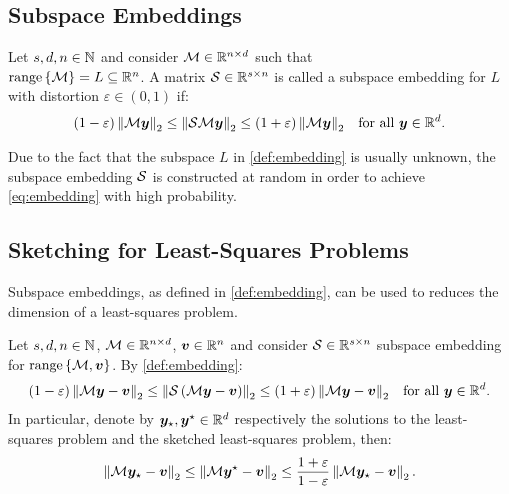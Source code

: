 \subsection{Subspace Embeddings}

\begin{definition} \label{def:embedding}
    Let $s, d, n \in \mathbb{N}$ and consider $\mathcal{M} \in \mathbb{R}^{n \times d}$ such that \\ $\operatorname*{range}\left\{\mathcal{M}\right\} = L \subseteq \mathbb{R}^{n}$. A matrix $\mathcal{S} \in \mathbb{R}^{s \times n}$ is called a subspace embedding for $L$ with distortion $\varepsilon \in \left(0, 1\right)$ if:
    \begin{align}
        \left( 1 - \varepsilon \right) \left\lVert \mathcal{M} \bm{y} \right\rVert_2 \leq \left\lVert \mathcal{S} \mathcal{M} \bm{y} \right\rVert_2 &\leq \left( 1 + \varepsilon \right) \left\lVert \mathcal{M} \bm{y} \right\rVert_2 &\text{for all } \bm{y} \in \mathbb{R}^{d}. \label{eq:embedding}
    \end{align}
\end{definition}

Due to the fact that the subspace $L$ in \cref{def:embedding} is usually unknown, the subspace embedding $\mathcal{S}$ is constructed at random in order to achieve \cref{eq:embedding} with high probability.

\subsection{Sketching for Least-Squares Problems}

Subspace embeddings, as defined in \cref{def:embedding}, can be used to reduces the dimension of a least-squares problem.

\begin{Fact} \label{fact:least_squares}
    Let $s, d, n \in \mathbb{N}$, $\mathcal{M} \in \mathbb{R}^{n \times d}$, $\bm{v} \in \mathbb{R}^{n}$ and consider $\mathcal{S} \in \mathbb{R}^{s \times n}$ subspace embedding for $\operatorname*{range}\left\{\mathcal{M}, \bm{v}\right\}$. By \cref{def:embedding}:
    \begin{align}
        \left( 1 - \varepsilon \right) \left\lVert \mathcal{M} \bm{y} - \bm{v} \right\rVert_2 \leq \left\lVert \mathcal{S} \left( \mathcal{M} \bm{y} - \bm{v} \right) \right\rVert_2 &\leq \left( 1 + \varepsilon \right) \left\lVert \mathcal{M} \bm{y} - \bm{v} \right\rVert_2 &\text{for all } \bm{y} \in \mathbb{R}^{d}. \label{eq:sketched_least_squares_1}
    \end{align}
    In particular, denote by $\bm{y}_{\star}, \bm{y}^{\star} \in \mathbb{R}^{d}$ respectively the solutions to the least-squares problem and the sketched least-squares problem, then:
    \begin{align}
        \left\lVert \mathcal{M} \bm{y}_{\star} - \bm{v} \right\rVert_2 \leq \left\lVert \mathcal{M} \bm{y}^{\star} - \bm{v} \right\rVert_2 \leq \frac{1 + \varepsilon}{1 - \varepsilon} \left\lVert \mathcal{M} \bm{y}_{\star} - \bm{v} \right\rVert_2. \label{eq:sketched_least_squares_2}
    \end{align}
\end{Fact}

